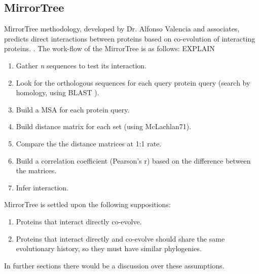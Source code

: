 \documentclass[11pt]{article}
\begin{document}
\subsection{MirrorTree}
MirrorTree methodology, developed by Dr. Alfonso Valencia and associates, predicts direct interactions between proteins based on co-evolution of interacting proteins. \cite{Pazos2001}. The work-flow of the MirrorTree is as follows: EXPLAIN
\begin{enumerate}
\setlength{\itemsep}{1pt}
	\item Gather \textit{n} sequences to test its interaction.
	\item Look for the orthologous sequences for each query protein query (search by homology, using BLAST \cite{BLAST}).
	\item Build a MSA for each protein query.
	\item Build distance matrix for each set (using McLachlan71).
	\item Compare the the distance matrices at 1:1 rate.
	\item Build a correlation coefficient (Pearson's r) based on the difference between the matrices.
	\item Infer interaction.
\end{enumerate}
MirrorTree is settled upon the following suppositions:
\begin{enumerate}
\setlength{\itemsep}{1pt}
	\item Proteins that interact directly co-evolve.
	\item Proteins that interact directly and co-evolve should share the same evolutionary history, so they must have similar phylogenies.
\end{enumerate}
In further sections there would be a discussion over these assumptions.
\end{document}
